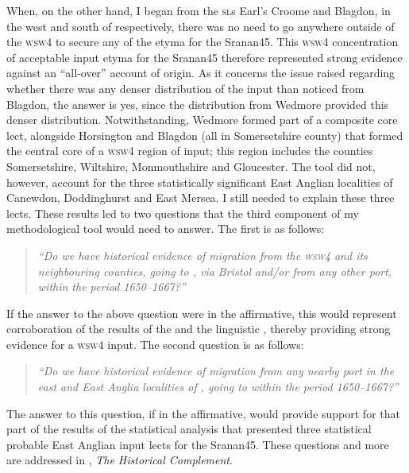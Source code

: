 When, on the other hand, I began from the \textsc{sl}s Earl's Croome and Blagdon, in the west and south of  respectively, there was no need to go anywhere outside of the \textsc{wsw4} to secure any of the  etyma for the Sranan45. This \textsc{wsw4}  concentration of acceptable input etyma for the Sranan45 therefore represented strong evidence against an ``all-over''  account of origin. As it concerns the issue raised regarding whether there was any denser distribution of the input than noticed from Blagdon, the answer is yes, since the distribution from Wedmore provided this denser distribution. Notwithstanding, Wedmore formed part of a composite core lect, alongside Horsington and Blagdon (all in Somersetshire county) that formed the central core of a \textsc{wsw4} region of input; this region includes the counties Somersetshire, Wiltshire, Monmouthshire and Gloucester. The  tool did not, however, account for the three statistically significant East Anglian localities of Canewdon, Doddinghurst and East Mersea. I still needed to explain these three lects. These results led to two questions that the third component of my methodological tool would need to answer. The first is as follows:

\begin{quote}
\emph{``Do we have historical evidence of migration from the \textsc{wsw4} and its neighbouring counties, going to , via Bristol and/or from any other port, within the period 1650--1667?''}
\end{quote}

If the answer to the above question were in the affirmative, this would represent corroboration of the results of the  and the linguistic , thereby providing strong evidence for a \textsc{wsw4} input. The second question is as follows:

\begin{quote}
\emph{``Do we have historical evidence of migration from any nearby port in the east and East Anglia localities of , going to  within the period 1650--1667?''}
\end{quote}

The answer to this question, if in the affirmative, would provide support for that part of the results of the statistical analysis that presented three statistical probable East Anglian input lects for the Sranan45. These questions and more are addressed in , \emph{The Historical Complement}.
